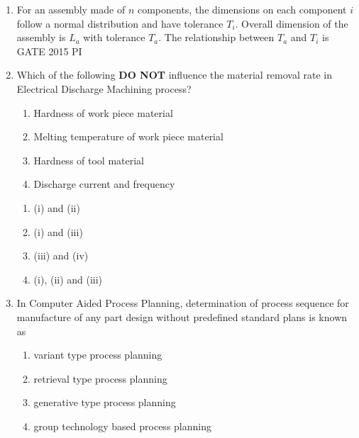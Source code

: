 \documentclass[journal,12pt,onecolumn]{IEEEtran}
\theoremstyle{remark}
\begin{document}
\begin{enumerate}
\item For an assembly made of $n$ components, the dimensions on each component $i$ follow a normal distribution and have tolerance $T_{i}$. Overall dimension of the assembly is $L_{a}$ with tolerance $T_{a}$. The relationship between $T_{a}$ and $T_{i}$ is
\hfill{GATE 2015 PI}
\begin{enumerate}
\end{enumerate}
\item Which of the following \textbf{DO NOT} influence the material removal rate in Electrical Discharge Machining process?
\begin{enumerate}
    \item Hardness of work piece material
    \item Melting temperature of work piece material
    \item Hardness of tool material
    \item Discharge current and frequency
\end{enumerate}
\begin{enumerate}
    \item (i) and (ii)
    \item (i) and (iii)
    \item (iii) and (iv)
    \item (i), (ii) and (iii)
\end{enumerate}


\item In Computer Aided Process Planning, determination of process sequence for manufacture of any part design without predefined standard plans is known as
\begin{enumerate}
    \item variant type process planning
    \item retrieval type process planning
    \item generative type process planning
    \item group technology based process planning
\end{enumerate}



\end{enumerate}
\end{document}
